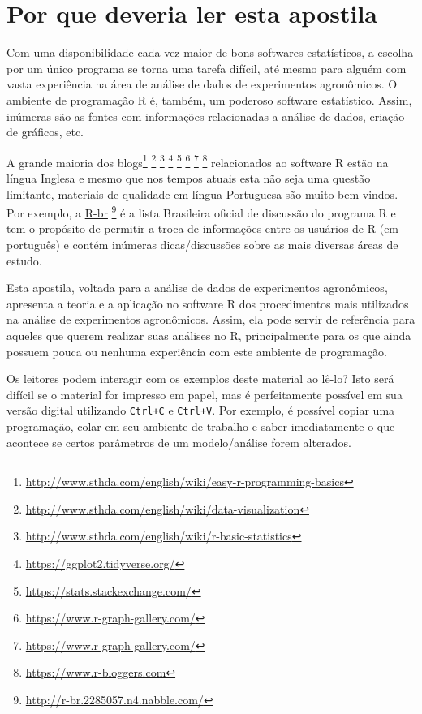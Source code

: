 \documentclass[]{book}
\let\rmarkdownfootnote\footnote%
\def\footnote{\protect\rmarkdownfootnote}
\begin{document}
\hypertarget{por-que-deveria-ler-esta-apostila}{%
\chapter*{Por que deveria ler esta apostila}\label{por-que-deveria-ler-esta-apostila}}

Com uma disponibilidade cada vez maior de bons softwares estatísticos, a escolha por um único programa se torna uma tarefa difícil, até mesmo para alguém com vasta experiência na área de análise de dados de experimentos agronômicos. O ambiente de programação R é, também, um poderoso software estatístico. Assim, inúmeras são as fontes com informações relacionadas a análise de dados, criação de gráficos, etc.

A grande maioria dos blogs\footnote{\url{http://www.sthda.com/english/wiki/easy-r-programming-basics}} \footnote{\url{http://www.sthda.com/english/wiki/data-visualization}} \footnote{\url{http://www.sthda.com/english/wiki/r-basic-statistics}} \footnote{\url{https://ggplot2.tidyverse.org/}} \footnote{\url{https://stats.stackexchange.com/}} \footnote{\url{https://www.r-graph-gallery.com/}} \footnote{\url{https://www.r-graph-gallery.com/}} \footnote{\url{https://www.r-bloggers.com}} relacionados ao software R estão na língua Inglesa e mesmo que nos tempos atuais esta não seja uma questão limitante, materiais de qualidade em língua Portuguesa são muito bem-vindos. Por exemplo, a \href{http://r-br.2285057.n4.nabble.com/}{R-br} \footnote{\url{http://r-br.2285057.n4.nabble.com/}} é a lista Brasileira oficial de discussão do programa R e tem o propósito de permitir a troca de informações entre os usuários de R (em português) e contém inúmeras dicas/discussões sobre as mais diversas áreas de estudo.

Esta apostila, voltada para a análise de dados de experimentos agronômicos, apresenta a teoria e a aplicação no software R dos procedimentos mais utilizados na análise de experimentos agronômicos. Assim, ela pode servir de referência para aqueles que querem realizar suas análises no R, principalmente para os que ainda possuem pouca ou nenhuma experiência com este ambiente de programação.

Os leitores podem interagir com os exemplos deste material ao lê-lo? Isto será difícil se o material for impresso em papel, mas é perfeitamente possível em sua versão digital utilizando \texttt{Ctrl+C} e \texttt{Ctrl+V}. Por exemplo, é possível copiar uma programação, colar em seu ambiente de trabalho e saber imediatamente o que acontece se certos parâmetros de um modelo/análise forem alterados.
\end{document}
